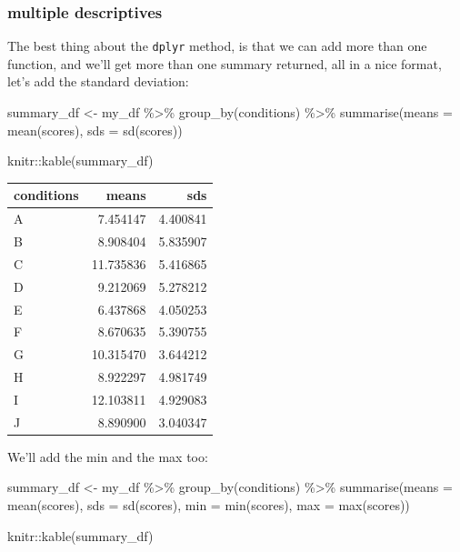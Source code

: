 \documentclass[
]{book}
\newenvironment{Shaded}{\begin{snugshade}}{\end{snugshade}}
\newcommand{\AttributeTok}[1]{\textcolor[rgb]{0.77,0.63,0.00}{#1}}
\newcommand{\FunctionTok}[1]{\textcolor[rgb]{0.00,0.00,0.00}{#1}}
\newcommand{\NormalTok}[1]{#1}
\newcommand{\OtherTok}[1]{\textcolor[rgb]{0.56,0.35,0.01}{#1}}
\newcommand{\SpecialCharTok}[1]{\textcolor[rgb]{0.00,0.00,0.00}{#1}}
\begin{document}
\hypertarget{multiple-descriptives}{%
\subsubsection{multiple descriptives}\label{multiple-descriptives}}

The best thing about the \texttt{dplyr} method, is that we can add more than one function, and we'll get more than one summary returned, all in a nice format, let's add the standard deviation:

\begin{Shaded}
\begin{Highlighting}[]
\NormalTok{summary\_df }\OtherTok{\textless{}{-}}\NormalTok{ my\_df }\SpecialCharTok{\%\textgreater{}\%}
               \FunctionTok{group\_by}\NormalTok{(conditions) }\SpecialCharTok{\%\textgreater{}\%}
               \FunctionTok{summarise}\NormalTok{(}\AttributeTok{means =} \FunctionTok{mean}\NormalTok{(scores),}
                         \AttributeTok{sds =} \FunctionTok{sd}\NormalTok{(scores))}

\NormalTok{knitr}\SpecialCharTok{::}\FunctionTok{kable}\NormalTok{(summary\_df)}
\end{Highlighting}
\end{Shaded}

\begin{tabular}{l|r|r}
\hline
conditions & means & sds\\
\hline
A & 7.454147 & 4.400841\\
\hline
B & 8.908404 & 5.835907\\
\hline
C & 11.735836 & 5.416865\\
\hline
D & 9.212069 & 5.278212\\
\hline
E & 6.437868 & 4.050253\\
\hline
F & 8.670635 & 5.390755\\
\hline
G & 10.315470 & 3.644212\\
\hline
H & 8.922297 & 4.981749\\
\hline
I & 12.103811 & 4.929083\\
\hline
J & 8.890900 & 3.040347\\
\hline
\end{tabular}

We'll add the min and the max too:

\begin{Shaded}
\begin{Highlighting}[]
\NormalTok{summary\_df }\OtherTok{\textless{}{-}}\NormalTok{ my\_df }\SpecialCharTok{\%\textgreater{}\%}
               \FunctionTok{group\_by}\NormalTok{(conditions) }\SpecialCharTok{\%\textgreater{}\%}
               \FunctionTok{summarise}\NormalTok{(}\AttributeTok{means =} \FunctionTok{mean}\NormalTok{(scores),}
                         \AttributeTok{sds =} \FunctionTok{sd}\NormalTok{(scores),}
                         \AttributeTok{min =} \FunctionTok{min}\NormalTok{(scores),}
                         \AttributeTok{max =} \FunctionTok{max}\NormalTok{(scores))}

\NormalTok{knitr}\SpecialCharTok{::}\FunctionTok{kable}\NormalTok{(summary\_df)}
\end{Highlighting}
\end{Shaded}
\end{document}

